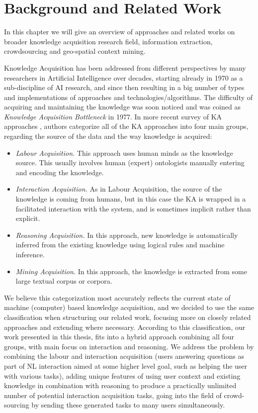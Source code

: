 \chapter{Background and Related Work}

In this chapter we will give an overview of approaches and related works on broader knowledge acquisition research field, information extraction, crowdsourcing and geo-spatial context mining. 

Knowledge Acquisition has been addressed from different perspectives by many researchers in Artificial Intelligence over decades, starting already in 1970 as a sub-discipline of AI research, and since then resulting in a big number of types and implementations of approaches and technologies/algorithms. The difficulty of acquiring and maintaining the knowledge was soon noticed and was coined as \emph{Knowledge Acquisition Bottleneck} in 1977\parencite{Feigenbaum1977}. In more recent survey of KA approaches \parencite{Zang2013}, authors categorize all of the KA approaches into four main groups, regarding the source of the data and the way knowledge is acquired:
\begin{itemize}
	\item \emph{Labour Acquisition.} This approach uses human minds as the knowledge source. This usually involves human (expert) ontologists manually entering and encoding the knowledge.
	\item \emph{Interaction Acquisition.} As in Labour Acquisition, the source of the knowledge is coming from humans, but in this case the KA is wrapped in a facilitated interaction with the system, and is sometimes implicit rather than explicit.
	\item \emph{Reasoning Acquisition.} In this approach, new knowledge is automatically inferred from the existing knowledge using logical rules and machine inference.
	\item \emph{Mining Acquisition.} In this approach, the knowledge is extracted from some large textual corpus or corpora.
\end{itemize}

We believe this categorization most accurately reflects the current state of machine (computer) based knowledge acquisition, and we decided to use the same classification when structuring our related work, focusing more on closely related approaches and extending where necessary. According to this classification, our work presented in this thesis, fits into a hybrid approach combining all four groups, with main focus on interaction and reasoning. We address the problem by combining the labour and interaction acquisition (users answering questions as part of NL interaction aimed at some higher level goal, such as helping the user with various tasks), adding unique features of using user context and existing knowledge in combination with reasoning to produce a practically unlimited number of potential interaction acquisition tasks, going into the field of crowd-sourcing by sending these generated tasks to many users simultaneously.

